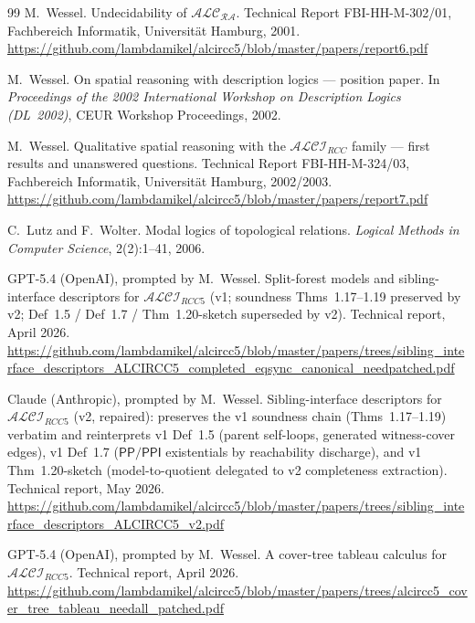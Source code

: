 \documentclass[
]{ceurart}
\theoremstyle{definition}
\newcommand{\ALC}{\ensuremath{\mathcal{ALC}}}
\newcommand{\ALCIRCC}[1]{\ensuremath{\mathcal{ALCI}_{\mathit{RCC#1}}}}
\newcommand{\PP}{\ensuremath{\mathsf{PP}}}
\newcommand{\PPI}{\ensuremath{\mathsf{PPI}}}
\begin{document}
\begin{thebibliography}{99}
M.\ Wessel.
\newblock Undecidability of $\ALC_{\mathcal{RA}}$.
\newblock Technical Report FBI-HH-M-302/01, Fachbereich Informatik,
  Universit\"at Hamburg, 2001.
\newblock \url{https://github.com/lambdamikel/alcircc5/blob/master/papers/report6.pdf}

M.\ Wessel.
\newblock On spatial reasoning with description logics --- position paper.
\newblock In \emph{Proceedings of the 2002 International Workshop on
  Description Logics (DL~2002)}, CEUR Workshop Proceedings, 2002.

M.\ Wessel.
\newblock Qualitative spatial reasoning with the $\ALCIRCC{}$ family ---
  first results and unanswered questions.
\newblock Technical Report FBI-HH-M-324/03, Fachbereich Informatik,
  Universit\"at Hamburg, 2002/2003.
\newblock \url{https://github.com/lambdamikel/alcircc5/blob/master/papers/report7.pdf}

C.\ Lutz and F.\ Wolter.
\newblock Modal logics of topological relations.
\newblock \emph{Logical Methods in Computer Science}, 2(2):1--41, 2006.


GPT-5.4 (OpenAI), prompted by M.\ Wessel.
\newblock Split-forest models and sibling-interface descriptors for
  $\ALCIRCC{5}$ (v1; soundness Thms~1.17--1.19 preserved by v2;
  Def~1.5 / Def~1.7 / Thm~1.20-sketch superseded by v2).
\newblock Technical report, April 2026.
\newblock \url{https://github.com/lambdamikel/alcircc5/blob/master/papers/trees/sibling_interface_descriptors_ALCIRCC5_completed_eqsync_canonical_needpatched.pdf}

Claude (Anthropic), prompted by M.\ Wessel.
\newblock Sibling-interface descriptors for $\ALCIRCC{5}$ (v2,
  repaired): preserves the v1 soundness chain
  (Thms~1.17--1.19) verbatim and reinterprets v1 Def~1.5
  (parent self-loops, generated witness-cover edges), v1 Def~1.7
  ($\PP/\PPI$ existentials by reachability discharge), and v1
  Thm~1.20-sketch (model-to-quotient delegated to v2 completeness
  extraction).
\newblock Technical report, May 2026.
\newblock \url{https://github.com/lambdamikel/alcircc5/blob/master/papers/trees/sibling_interface_descriptors_ALCIRCC5_v2.pdf}

GPT-5.4 (OpenAI), prompted by M.\ Wessel.
\newblock A cover-tree tableau calculus for $\ALCIRCC{5}$.
\newblock Technical report, April 2026.
\newblock \url{https://github.com/lambdamikel/alcircc5/blob/master/papers/trees/alcircc5_cover_tree_tableau_needall_patched.pdf}


\end{thebibliography}
\end{document}
